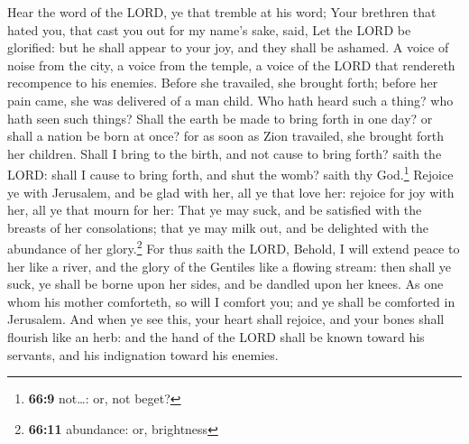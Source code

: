  Hear the word of the LORD, ye that tremble at his word;
Your brethren that hated you, that cast you out for my name's sake,
said, Let the LORD be glorified: but he shall appear to your joy, and
they shall be ashamed.  A voice of noise from the city, a
voice from the temple, a voice of the LORD that rendereth recompence to
his enemies.  Before she travailed, she brought forth;
before her pain came, she was delivered of a man child. 
Who hath heard such a thing? who hath seen such things? Shall the earth
be made to bring forth in one day? or shall a nation be born at once?
for as soon as Zion travailed, she brought forth her children.
 Shall I bring to the birth, and not cause to bring forth?
saith the LORD: shall I cause to bring forth, and shut the womb? saith
thy God.\footnote{\textbf{66:9} not\ldots: or, not beget?}
 Rejoice ye with Jerusalem, and be glad with her, all ye
that love her: rejoice for joy with her, all ye that mourn for her:
 That ye may suck, and be satisfied with the breasts of
her consolations; that ye may milk out, and be delighted with the
abundance of her glory.\footnote{\textbf{66:11} abundance: or,
  brightness}  For thus saith the LORD, Behold, I will
extend peace to her like a river, and the glory of the Gentiles like a
flowing stream: then shall ye suck, ye shall be borne upon her sides,
and be dandled upon her knees.  As one whom his mother
comforteth, so will I comfort you; and ye shall be comforted in
Jerusalem.  And when ye see this, your heart shall
rejoice, and your bones shall flourish like an herb: and the hand of the
LORD shall be known toward his servants, and his indignation toward his
enemies.

